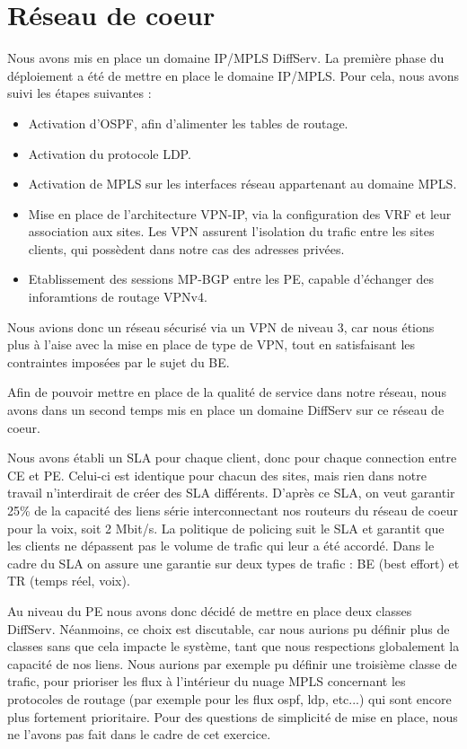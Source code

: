 \documentclass[a4paper,11pt]{article}
\let\Oldsection\section
\renewcommand{\section}{\FloatBarrier\Oldsection}
\begin{document}
\section{Réseau de coeur}

Nous avons mis en place un domaine IP/MPLS DiffServ. 
La première phase du déploiement a été de mettre en place le domaine IP/MPLS. Pour cela, nous avons suivi les étapes suivantes :
\begin{itemize}
    \item Activation d'OSPF, afin d’alimenter les tables de routage.
    \item Activation du protocole LDP.
    \item Activation de MPLS sur les interfaces réseau appartenant au domaine MPLS.
    \item Mise en place de l'architecture VPN-IP, via la configuration des VRF et leur association aux sites. Les VPN assurent l’isolation du trafic entre les sites clients, qui possèdent dans notre cas des adresses privées.
    \item Etablissement des sessions MP-BGP entre les PE, capable d'échanger des inforamtions de routage VPNv4.
\end{itemize}

Nous avions donc un réseau sécurisé via un VPN de niveau 3, car nous étions plus à l'aise avec la mise en place de type de VPN, tout en satisfaisant les contraintes imposées par le sujet du BE. 

Afin de pouvoir mettre en place de la qualité de service dans notre réseau, nous avons dans un second temps mis en place un domaine DiffServ sur ce réseau de coeur. 

Nous avons établi un SLA pour chaque client, donc pour chaque connection entre CE et PE. Celui-ci est identique pour chacun des sites, mais rien dans notre travail n'interdirait de créer des SLA différents. D’après ce SLA, on veut garantir 25\% de la capacité des liens série interconnectant nos routeurs du réseau de coeur pour la voix, soit 2 Mbit/s. 
La politique de policing suit le SLA et garantit que les clients ne dépassent pas le volume de trafic qui leur a été accordé. Dans le cadre du SLA on assure une garantie sur deux types de trafic : BE (best effort) et TR (temps réel, voix). 

Au niveau du PE nous avons donc décidé de mettre en place deux classes DiffServ. Néanmoins, ce choix est discutable, car nous aurions pu définir plus de classes sans que cela impacte le système, tant que nous respections globalement la capacité de nos liens. Nous aurions par exemple pu définir une troisième classe de trafic, pour prioriser les flux à l’intérieur du nuage MPLS concernant les protocoles de routage (par exemple pour les flux ospf, ldp, etc...) qui sont encore plus fortement prioritaire. Pour des questions de simplicité de mise en place, nous ne l’avons pas fait dans le cadre de cet exercice.
\end{document}
